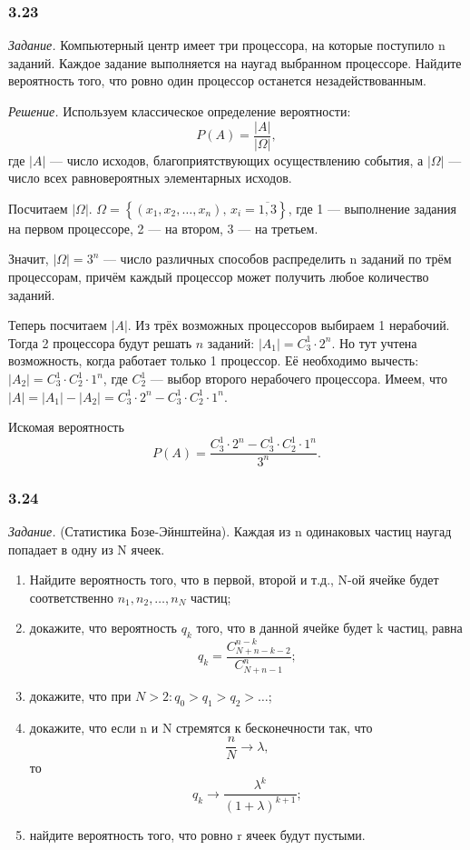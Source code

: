 \subsubsection*{3.23}

\textit{Задание.} Компьютерный центр имеет три процессора, на которые поступило n заданий.
Каждое задание выполняется на наугад выбранном процессоре.
Найдите вероятность того, что ровно один процессор останется незадействованным.

\textit{Решение.} Используем классическое определение вероятности:
$$ P \left( A \right) =
\frac{ \left| A \right| }{ \left| \Omega \right| },$$
где $ \left| A \right| $ --- число исходов, благоприятствующих осуществлению события, а $ \left| \Omega \right| $ --- число всех равновероятных элементарных исходов.

Посчитаем $ \left| \Omega \right| $.
$ \Omega = \left\{ \left( x_1, x_2, \dotsc, x_n \right), \, x_i = \overline{1,3} \right\} $, где 1 --- выполнение задания на первом процессоре, 2 --- на втором,
3 --- на третьем.

Значит, $ \left| \Omega \right| = 3^n $ ---
число различных способов распределить n заданий по трём процессорам,
причём каждый процессор может получить любое количество заданий.

Теперь посчитаем $ \left| A \right| $.
Из трёх возможных процессоров выбираем 1 нерабочий.
Тогда 2 процессора будут решать $n$ заданий: $ \left| A_1 \right| = C_3^1 \cdot 2^n$.
Но тут учтена возможность, когда работает только 1 процессор.
Её необходимо вычесть: $ \left| A_2 \right| = C_3^1 \cdot C_2^1 \cdot 1^n$, где $C_2^1$ --- выбор второго нерабочего процессора.
Имеем, что $ \left| A \right| = \left| A_1 \right| - \left| A_2 \right| = C_3^1 \cdot 2^n - C_3^1 \cdot C_2^1 \cdot 1^n$.

Искомая вероятность
$$ P \left( A \right) =
\frac{C_3^1 \cdot 2^n - C_3^1 \cdot C_2^1 \cdot 1^n}{3^n}.$$

\subsubsection*{3.24}

\textit{Задание.} (Статистика Бозе-Эйнштейна).
Каждая из n одинаковых частиц наугад попадает в одну из N ячеек.
\begin{enumerate}[label=\alph*)]
\item Найдите вероятность того, что в первой, второй и т.д., N-ой ячейке будет соответственно $ n_1, n_2, \dotsc , n_N $ частиц;
\item докажите, что вероятность $ q_k $ того, что в данной ячейке будет k частиц, равна
$$ q_k =
\frac{ C_{ N+n-k-2 }^{ n-k } }{ C_{ N+n-1 }^n };$$
\item докажите, что при $ N > 2 : q_0 > q_1 > q_2 > \dotsc $;
\item докажите, что если n и N стремятся к бесконечности так, что
$$ \frac{ n }{ N } \rightarrow \lambda,$$
то
$$ q_k \rightarrow \frac{ \lambda^k }{ \left( 1 + \lambda \right)^{ k+1 } };$$
\item найдите вероятность того, что ровно r ячеек будут пустыми.
\end{enumerate}

